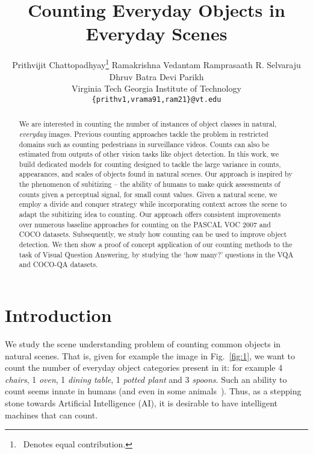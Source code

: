 \documentclass[10pt,twocolumn,letterpaper]{article}
\begin{document}
\title{Counting Everyday Objects in Everyday Scenes}

\author{
    Prithvijit Chattopadhyay\thanks{\,\,\,Denotes equal contribution.} \quad Ramakrishna Vedantam \quad Ramprasaath R. Selvaraju \\ \quad Dhruv Batra \quad Devi Parikh\\
    Virginia Tech \quad Georgia Institute of Technology\\
    {\tt\small \{prithv1,vrama91,ram21\}@vt.edu} \\
}



\maketitle


\begin{abstract}
We are interested in counting the number of instances of object classes in natural, \emph{everyday} images. 
Previous counting approaches tackle the problem in restricted domains such as counting pedestrians in surveillance videos.
Counts can also be estimated from outputs of other vision tasks like object detection. In this work, we build dedicated models for counting designed to tackle the large variance in counts, appearances, and scales of objects found in natural scenes. Our approach is inspired by the phenomenon of subitizing -- the ability of humans to make quick assessments of counts given a perceptual signal, for small count values. Given a natural scene, we employ a divide and conquer strategy while incorporating context across the scene to adapt the subitizing idea to counting. Our approach offers consistent improvements over numerous baseline approaches for counting 
on the PASCAL VOC 2007 and COCO datasets. Subsequently, we study 
how counting can be used to improve object detection. We then show a proof of concept application of our counting methods to the task of Visual Question Answering, by studying the `how many?' questions in the VQA and COCO-QA datasets.
\end{abstract}
\section{Introduction}\label{sec:intro}
We study the scene understanding problem of counting common objects in natural scenes.
That is, given for example the image in Fig.~\ref{fig:1}, we want to count the number of everyday object categories present in it: for example 4 \emph{chairs}, 1 \emph{oven}, 1 \emph{dining table}, 1 \emph{potted plant} and 3 \emph{spoons}. Such an ability to count seems innate in humans (and even in some animals~\cite{CutiniS}). Thus, as a stepping stone towards Artificial Intelligence (AI), it is desirable to have intelligent machines that can count. 
\end{document}
